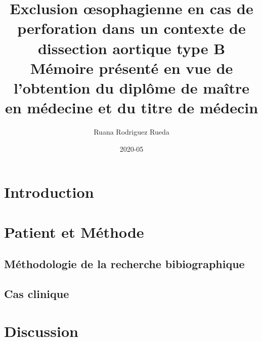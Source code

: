 \documentclass{article}
\title{
{Exclusion œsophagienne en cas de perforation dans un contexte de dissection aortique type B}\\
\large Mémoire présenté en vue de l'obtention du diplôme de maître en médecine et du titre de médecin}
\author{Ruana Rodriguez Rueda}
\date{2020-05}
\begin{document}


\section{Introduction}
    

\section{Patient et Méthode}

    \subsection{Méthodologie de la recherche bibiographique}
        

    \subsection{Cas clinique}
        

\section{Discussion}
    
\end{document}
